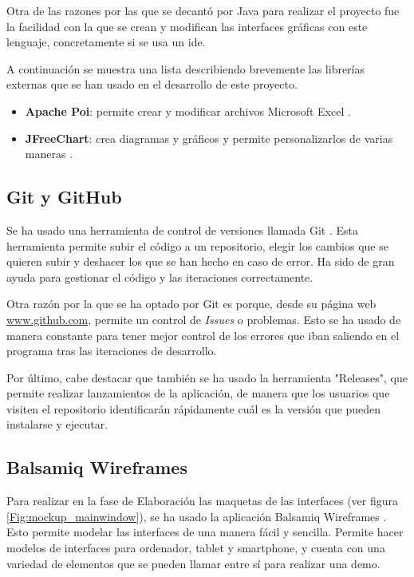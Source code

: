 Otra de las razones por las que se decantó por Java para realizar el proyecto fue la facilidad con la que se crean y modifican las interfaces gráficas con este lenguaje, concretamente si se usa un \gls{ide}.

A continuación se muestra una lista describiendo brevemente las librerías externas que se han usado en el desarrollo de este proyecto.
\begin{itemize}
	\item \textbf{Apache Poi}: permite crear y modificar archivos Microsoft Excel \cite{apachepoi}.
	\item \textbf{JFreeChart}: crea diagramas y gráficos y permite personalizarlos de varias maneras \cite{jfreechart}.
\end{itemize}

\subsection{Git y GitHub}
Se ha usado una herramienta de control de versiones llamada Git \cite{git}. Esta herramienta permite subir el código a un repositorio, elegir los cambios que se quieren subir y deshacer los que se han hecho en caso de error. Ha sido de gran ayuda para gestionar el código y las iteraciones correctamente.

Otra razón por la que se ha optado por Git es porque, desde su página web \url{www.github.com}, permite un control de \textit{Issues} o problemas. Esto se ha usado de manera constante para tener mejor control de los errores que iban saliendo en el programa tras las iteraciones de desarrollo.

Por último, cabe destacar que también se ha usado la herramienta "Releases", que permite realizar lanzamientos de la aplicación, de manera que los usuarios que visiten el repositorio identificarán rápidamente cuál es la versión que pueden instalarse y ejecutar.


\subsection{Balsamiq Wireframes}
\label{sub:balsamiq}
Para realizar en la fase de Elaboración las maquetas de las interfaces (ver figura \ref{Fig:mockup_mainwindow}), se ha usado la aplicación Balsamiq Wireframes \cite{balsamiq}. Esto permite modelar las interfaces de una manera fácil y sencilla. Permite hacer modelos de interfaces para ordenador, tablet y smartphone, y cuenta con una variedad de elementos que se pueden llamar entre sí para realizar una demo.

